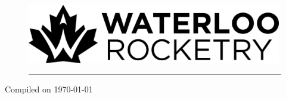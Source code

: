 
\begin{center}
\vspace*{6.6cm}
\begin{figure}[!h]
\centering
\includegraphics[width=30em]{common/mono_horizontal_standard}
\rule{\textwidth}{2pt}

\vspace{1cm}
\thetitle
\end{figure}

\vspace*{\fill}
\Large{}Compiled on \today
\end{center}
\newpage
